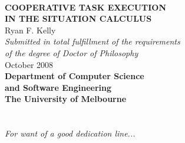 %
%
%
%





\begin{titlepage}
\begin{center}
\ \\
\vspace{3cm}
{\bf\LARGE  COOPERATIVE TASK EXECUTION }\\ \vspace{0.5cm} %
{\bf\LARGE  IN THE SITUATION CALCULUS } \\ %
\vspace{2cm}
{\LARGE      Ryan F. Kelly       }\\
\vspace{5cm}
{\em\large Submitted in total fulfillment of the requirements}\\ \vspace{0.1cm}
{\em\large        of the degree of Doctor of Philosophy     }\\
\vspace{0.5cm}
{\Large             October 2008        }\\
\vspace{2.5cm}
{\bf\large Department of Computer Science\\ and Software Engineering}\\ \vspace{0.5cm}
{\bf\Large        The University of Melbourne     }\\
\vspace{0.5cm}
\end{center}
\end{titlepage}
\cleardoublepage     %

\chapter*{ } %
\begin{center}
\emph{For want of a good dedication line...}
\end{center}


